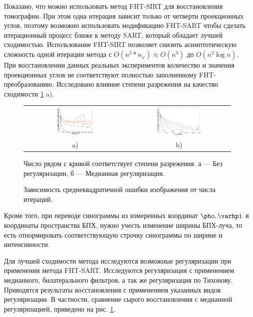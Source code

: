 Показано, что можно использовать метод FHT-SIRT для восстановления томографии.
При этом одна итерация зависит только от четверти проекционных углов, поэтому возможно использовать модификацию FHT-SART чтобы сделать итерационный процесс ближе к методу SART, который обладает лучшей сходимостью.
Использование FHT-SIRT позволяет снизить асимптотическую сложность одной итерации метода с $O(n^2 * n_\varphi) \approx O(n^3)$ до $O(n^2 \log n)$.
При восстановлении данных реальных экспериментов количество и значения проекционных углов не соответствуют полностью заполненному FHT-преобразованию. 
Исследовано влияние степени разрежения на качество сходимости \ref{fig:conv_all} a).

\begin{figure}
\centering
\begin{tabular}{@{}c@{}c}
    \includegraphics[width=0.45\textwidth]{Dissertation/images/part1_img/raw}
&
    \includegraphics[width=0.45\textwidth]{Dissertation/images/part1_img/medk}
\\
   \small a) & \small b)
\end{tabular}
  \caption{Зависимость среднеквадратичной ошибки изображения от числа итераций.}
Число рядом с кривой соответствует степени разрежения. а --- Без регуляризации, б --- Медианная регуляризация.
\label{fig:conv_all}
\end{figure}

Кроме того, при переводе синограммы из измеренных координат $\pho, \varhpi$ в координаты пространства БПХ, нужно учесть изменение ширины БПХ-луча, то есть отнормировать соответствующую строчку синограммы по ширине и интенсивности.

Для лучшей сходимости метода исследуются возможные регуляризации при применении метода FHT-SART.
Исследуются регуляризация с применением медианного, билатерального фильтров, а так же регуляризация по Тихонову.
Приводятся результаты восстановления с применением указанных видов регуляризации.
В частности, сравнение сырого восстановления с медианной регуляризацией, приведено на рис. \ref{fig:conv_all}.


